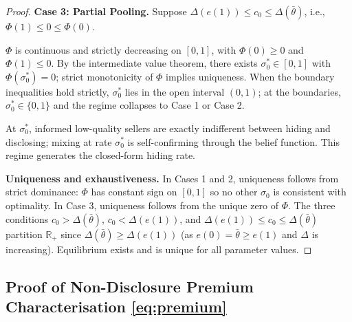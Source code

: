 \documentclass[10pt,letterpaper]{bp-template-concise}
\begin{document}
\begin{proof}
\medskip
\textbf{Case 3: Partial Pooling.} Suppose $\Delta(e(1)) \leq c_0 \leq \Delta(\bar{\theta})$, i.e., $\Phi(1) \leq 0 \leq \Phi(0)$.

$\Phi$ is continuous and strictly decreasing on $[0,1]$, with $\Phi(0) \geq 0$ and $\Phi(1) \leq 0$. By the intermediate value theorem, there exists $\sigma_0^* \in [0,1]$ with $\Phi(\sigma_0^*) = 0$; strict monotonicity of $\Phi$ implies uniqueness. When the boundary inequalities hold strictly, $\sigma_0^*$ lies in the open interval $(0,1)$; at the boundaries, $\sigma_0^* \in \{0,1\}$ and the regime collapses to Case 1 or Case 2.

At $\sigma_0^*$, informed low-quality sellers are exactly indifferent between hiding and disclosing; mixing at rate $\sigma_0^*$ is self-confirming through the belief function. This regime generates the closed-form hiding rate.

\medskip
\textbf{Uniqueness and exhaustiveness.} In Cases 1 and 2, uniqueness follows from strict dominance: $\Phi$ has constant sign on $[0,1]$ so no other $\sigma_0$ is consistent with optimality. In Case 3, uniqueness follows from the unique zero of $\Phi$. The three conditions $c_0 > \Delta(\bar{\theta})$, $c_0 < \Delta(e(1))$, and $\Delta(e(1)) \leq c_0 \leq \Delta(\bar{\theta})$ partition $\mathbb{R}_{+}$ since $\Delta(\bar{\theta}) \geq \Delta(e(1))$ (as $e(0) = \bar{\theta} \geq e(1)$ and $\Delta$ is increasing). Equilibrium exists and is unique for all parameter values.
\end{proof}

\subsection*{Proof of Non-Disclosure Premium Characterisation \eqref{eq:premium}}
\end{document}
